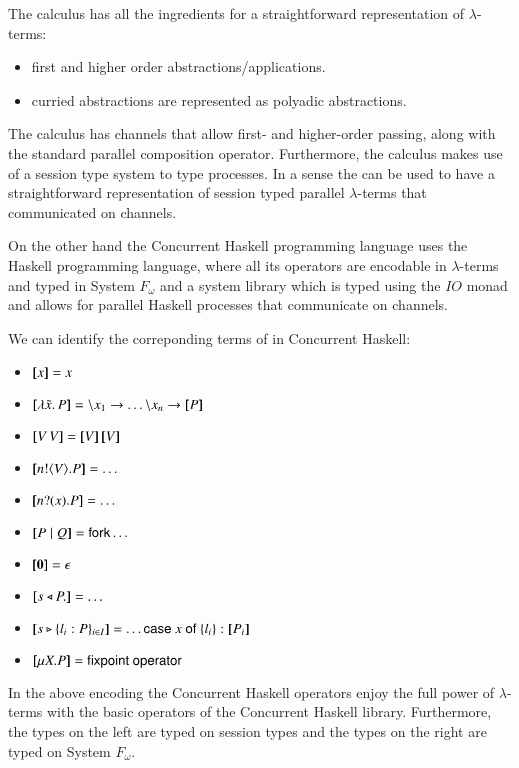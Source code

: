 The \PHOpp calculus has all the ingredients for a straightforward
representation of $\lambda$-terms:
\begin{itemize}
	\item	first and higher order abstractions/applications.
	\item	curried abstractions are represented as polyadic abstractions.
\end{itemize}
The \PHOpp calculus has channels that allow first- and higher-order
passing, along with the standard parallel composition operator.
Furthermore, the calculus makes use of a session type system to
type processes.
In a sense the \PHOpp can be used to have a straightforward representation
of session typed parallel $\lambda$-terms that communicated on channels.

On the other hand the Concurrent Haskell programming language uses the
Haskell programming language, where all its operators are encodable in
$\lambda$-terms and typed in System $F_{\omega}$ and a system
library which is typed using the $IO$ monad 
and allows for parallel Haskell processes that communicate on channels.

We can identify the correponding terms of \PHOpp in Concurrent Haskell:
\begin{itemize}
	\item	$[\!\![x]\!\!] = x$
	\item	$\map{\abs{\tilde{x}}{P}} = \backslash x_1 \rightarrow \dots \backslash x_n \rightarrow \map{P}$
	\item	$\map{\appl{V}{V}} = \appl{\map{V}}{\map{V}}$
	\item	$[\!\![n ! \langle V \rangle . P]\!\!] = \dots$
	\item	$[\!\![n ? (x) . P]\!\!] = \dots$
	\item	$[\!\![P\;|\; Q]\!\!] = \mathsf{fork} \dots$
	\item	$[\!\![\mathbf{0}]\!\!] = \epsilon$
	\item	$[\!\![s \triangleleft P .]\!\!] = \dots$
	\item	$\map{\bbra{s}{l_i: P}_{i \in I}} = \dots \mathsf{case}\ x\ \mathsf{of}\ \set{l_i}: \map{P_i}$
	\item	$\map{\recp{X}{P}} = \mathsf{fixpoint\ operator}$
\end{itemize}

In the above encoding the Concurrent Haskell operators enjoy the full power
of $\lambda$-terms with the basic operators of the Concurrent Haskell library.
Furthermore, the types on the left are typed on session types and the
types on the right are typed on System $F_\omega$.

